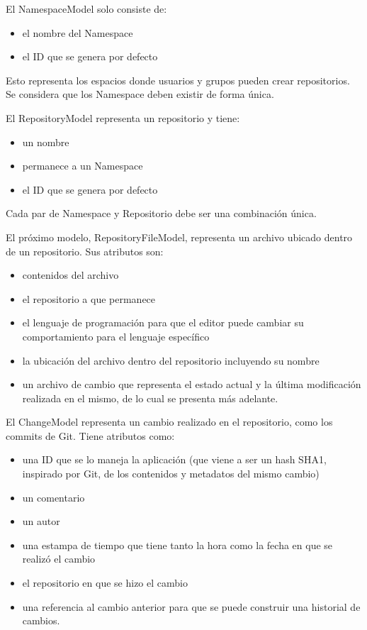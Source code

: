 El NamespaceModel solo consiste de:
\begin{itemize}
\item el nombre del Namespace
\item el ID que se genera por defecto
\end{itemize}
Esto representa los espacios donde usuarios y grupos pueden crear repositorios. Se considera que los Namespace deben existir de forma única.

El RepositoryModel representa un repositorio y tiene:
\begin{itemize}
\item un nombre
\item permanece a un Namespace
\item el ID que se genera por defecto
\end{itemize}
Cada par de Namespace y Repositorio debe ser una combinación única.

El próximo modelo, RepositoryFileModel, representa un archivo ubicado dentro de un repositorio. Sus atributos son:
\begin{itemize}
\item contenidos del archivo
\item el repositorio a que permanece
\item el lenguaje de programación para que el editor puede cambiar su comportamiento para el lenguaje específico
\item la ubicación del archivo dentro del repositorio incluyendo su nombre
\item un archivo de cambio que representa el estado actual y la última modificación realizada en el mismo, de lo cual se presenta más adelante.
\end{itemize}

El ChangeModel representa un cambio realizado en el repositorio, como los commits de Git. Tiene atributos como:
\begin{itemize}
\item una ID que se lo maneja la aplicación (que viene a ser un hash SHA1, inspirado por Git, de los contenidos y metadatos del mismo cambio)
\item un comentario
\item un autor
\item una estampa de tiempo que tiene tanto la hora como la fecha en que se realizó el cambio
\item el repositorio en que se hizo el cambio
\item una referencia al cambio anterior para que se puede construir una historial de cambios.
\end{itemize}

